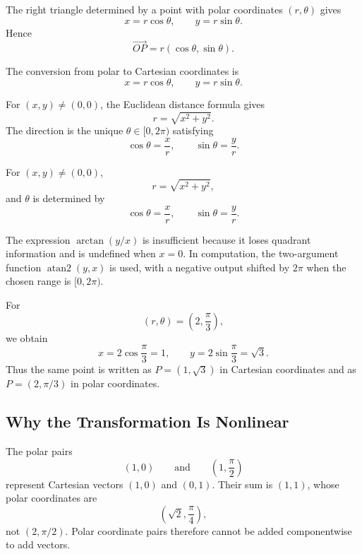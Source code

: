 \begin{derivationbox}
The right triangle determined by a point with polar coordinates $(r,\theta)$
gives
\[
x=r\cos\theta,
\qquad
y=r\sin\theta.
\]
Hence
\[
\overrightarrow{OP}=r(\cos\theta,\sin\theta).
\]
\end{derivationbox}

\begin{theorembox}
The conversion from polar to Cartesian coordinates is
\[
\boxed{
x=r\cos\theta,
\qquad
y=r\sin\theta
}.
\]
\end{theorembox}

\begin{derivationbox}
For $(x,y)\neq(0,0)$, the Euclidean distance formula gives
\[
r=\sqrt{x^2+y^2}.
\]
The direction is the unique $\theta\in[0,2\pi)$ satisfying
\[
\cos\theta=\frac{x}{r},
\qquad
\sin\theta=\frac{y}{r}.
\]
\end{derivationbox}

\begin{theorembox}
For $(x,y)\neq(0,0)$,
\[
\boxed{r=\sqrt{x^2+y^2}},
\]
and $\theta$ is determined by
\[
\boxed{
\cos\theta=\frac{x}{r},
\qquad
\sin\theta=\frac{y}{r}
}.
\]
\end{theorembox}

\begin{remarkbox}
The expression $\arctan(y/x)$ is insufficient because it loses quadrant
information and is undefined when $x=0$. In computation, the two-argument
function $\operatorname{atan2}(y,x)$ is used, with a negative output shifted by
$2\pi$ when the chosen range is $[0,2\pi)$.
\end{remarkbox}

\begin{examplebox}
For
\[
(r,\theta)=\left(2,\frac{\pi}{3}\right),
\]
we obtain
\[
x=2\cos\frac{\pi}{3}=1,
\qquad
y=2\sin\frac{\pi}{3}=\sqrt3.
\]
Thus the same point is written as $P=(1,\sqrt3)$ in Cartesian coordinates and as
$P=(2,\pi/3)$ in polar coordinates.
\end{examplebox}

\subsection*{Why the Transformation Is Nonlinear}

\begin{examplebox}
The polar pairs
\[
(1,0)
\qquad\text{and}\qquad
\left(1,\frac{\pi}{2}\right)
\]
represent Cartesian vectors $(1,0)$ and $(0,1)$. Their sum is $(1,1)$, whose
polar coordinates are
\[
\left(\sqrt2,\frac{\pi}{4}\right),
\]
not $(2,\pi/2)$. Polar coordinate pairs therefore cannot be added componentwise
to add vectors.
\end{examplebox}

